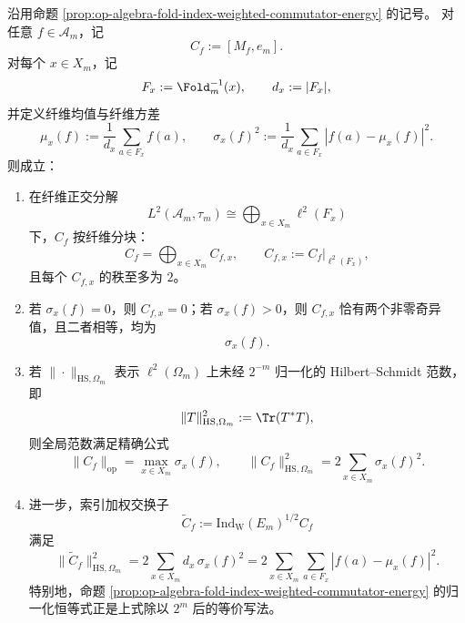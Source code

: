 \begin{theorem}\label{thm:op-algebra-fold-jones-commutator-rank2-spectrum}
沿用命题 \ref{prop:op-algebra-fold-index-weighted-commutator-energy} 的记号。
对任意 \(f\in\mathcal A_m\)，记
\[
C_f:=[M_f,e_m].
\]
对每个 \(x\in X_m\)，记
\[
F_x:=\Fold_m^{-1}(x),
\qquad
d_x:=|F_x|,
\]
并定义纤维均值与纤维方差
\[
\mu_x(f):=\frac1{d_x}\sum_{a\in F_x}f(a),
\qquad
\sigma_x(f)^2:=\frac1{d_x}\sum_{a\in F_x}|f(a)-\mu_x(f)|^2.
\]
则成立：
\begin{enumerate}
  \item 在纤维正交分解
  \[
  L^2(\mathcal A_m,\tau_m)\cong \bigoplus_{x\in X_m}\ell^2(F_x)
  \]
  下，\(C_f\) 按纤维分块：
  \[
  C_f=\bigoplus_{x\in X_m} C_{f,x},
  \qquad
  C_{f,x}:=C_f|_{\ell^2(F_x)},
  \]
  且每个 \(C_{f,x}\) 的秩至多为 \(2\)。
  \item 若 \(\sigma_x(f)=0\)，则 \(C_{f,x}=0\)；若 \(\sigma_x(f)>0\)，则 \(C_{f,x}\) 恰有两个非零奇异值，且二者相等，均为
  \[
  \sigma_x(f).
  \]
  \item 若 \(\|\cdot\|_{\mathrm{HS},\Omega_m}\) 表示 \(\ell^2(\Omega_m)\) 上未经 \(2^{-m}\) 归一化的 Hilbert--Schmidt 范数，即
  \[
  \|T\|_{\mathrm{HS},\Omega_m}^2:=\Tr(T^\ast T),
  \]
  则全局范数满足精确公式
  \[
  \|C_f\|_{\mathrm{op}}=\max_{x\in X_m}\sigma_x(f),
  \qquad
  \|C_f\|_{\mathrm{HS},\Omega_m}^{2}=2\sum_{x\in X_m}\sigma_x(f)^2.
  \]
  \item 进一步，索引加权交换子
  \[
  \widetilde C_f:=\mathrm{Ind}_{\mathrm W}(E_m)^{1/2}C_f
  \]
  满足
  \[
  \|\widetilde C_f\|_{\mathrm{HS},\Omega_m}^{2}
  =
  2\sum_{x\in X_m}d_x\,\sigma_x(f)^2
  =
  2\sum_{x\in X_m}\sum_{a\in F_x}|f(a)-\mu_x(f)|^2.
  \]
  特别地，命题 \ref{prop:op-algebra-fold-index-weighted-commutator-energy} 的归一化恒等式正是上式除以 \(2^m\) 后的等价写法。
\end{enumerate}
\end{theorem}
